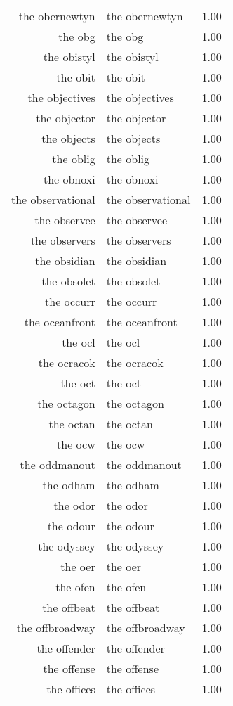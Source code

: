 \begin{table}[ht]
\begin{tabular}{rlr}
  the obernewtyn & the obernewtyn & 1.00 \\ 
  the obg & the obg & 1.00 \\ 
  the obistyl & the obistyl & 1.00 \\ 
  the obit & the obit & 1.00 \\ 
  the objectives & the objectives & 1.00 \\ 
  the objector & the objector & 1.00 \\ 
  the objects & the objects & 1.00 \\ 
  the oblig & the oblig & 1.00 \\ 
  the obnoxi & the obnoxi & 1.00 \\ 
  the observational & the observational & 1.00 \\ 
  the observee & the observee & 1.00 \\ 
  the observers & the observers & 1.00 \\ 
  the obsidian & the obsidian & 1.00 \\ 
  the obsolet & the obsolet & 1.00 \\ 
  the occurr & the occurr & 1.00 \\ 
  the oceanfront & the oceanfront & 1.00 \\ 
  the ocl & the ocl & 1.00 \\ 
  the ocracok & the ocracok & 1.00 \\ 
  the oct & the oct & 1.00 \\ 
  the octagon & the octagon & 1.00 \\ 
  the octan & the octan & 1.00 \\ 
  the ocw & the ocw & 1.00 \\ 
  the oddmanout & the oddmanout & 1.00 \\ 
  the odham & the odham & 1.00 \\ 
  the odor & the odor & 1.00 \\ 
  the odour & the odour & 1.00 \\ 
  the odyssey & the odyssey & 1.00 \\ 
  the oer & the oer & 1.00 \\ 
  the ofen & the ofen & 1.00 \\ 
  the offbeat & the offbeat & 1.00 \\ 
  the offbroadway & the offbroadway & 1.00 \\ 
  the offender & the offender & 1.00 \\ 
  the offense & the offense & 1.00 \\ 
  the offices & the offices & 1.00 \\ 

\end{tabular}
\end{table}
